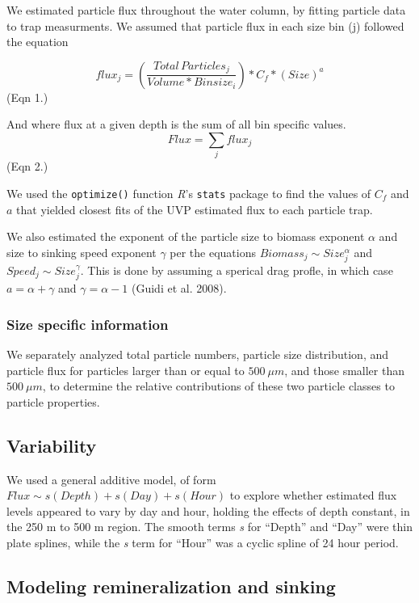 \documentclass[]{article}
\begin{document}
We estimated particle flux throughout the water column, by fitting
particle data to trap measurments. We assumed that particle flux in each
size bin (j) followed the equation

\[flux_j =  (\frac{Total\,Particles_j}{Volume * Binsize_i}) * C_f * (Size) ^ a \]
(Eqn 1.)

And where flux at a given depth is the sum of all bin specific values.
\[Flux = \sum_j{flux_j}\] (Eqn 2.)

We used the \texttt{optimize()} function \emph{R}'s \texttt{stats}
package to find the values of \(C_f\) and \(a\) that yielded closest
fits of the UVP estimated flux to each particle trap.

We also estimated the exponent of the particle size to biomass exponent
\(\alpha\) and size to sinking speed exponent \(\gamma\) per the
equations \(Biomass_j \sim Size_j^\alpha\) and
\(Speed_j \sim Size_j^\gamma\). This is done by assuming a sperical drag
profle, in which case \(a = \alpha + \gamma\) and \(\gamma = \alpha -1\)
(Guidi et al. 2008).

\hypertarget{size-specific-information}{%
\subsubsection{Size specific
information}\label{size-specific-information}}

We separately analyzed total particle numbers, particle size
distribution, and particle flux for particles larger than or equal to
\(500~\mu m\), and those smaller than \(500~\mu m\), to determine the
relative contributions of these two particle classes to particle
properties.

\hypertarget{variability}{%
\subsection{Variability}\label{variability}}

We used a general additive model, of form
\(Flux \sim s(Depth) + s(Day) + s(Hour)\) to explore whether estimated
flux levels appeared to vary by day and hour, holding the effects of
depth constant, in the 250 m to 500 m region. The smooth terms \emph{s}
for ``Depth'' and ``Day'' were thin plate splines, while the \emph{s}
term for ``Hour'' was a cyclic spline of 24 hour period.

\hypertarget{modeling-remineralization-and-sinking}{%
\subsection{Modeling remineralization and
sinking}\label{modeling-remineralization-and-sinking}}
\end{document}
